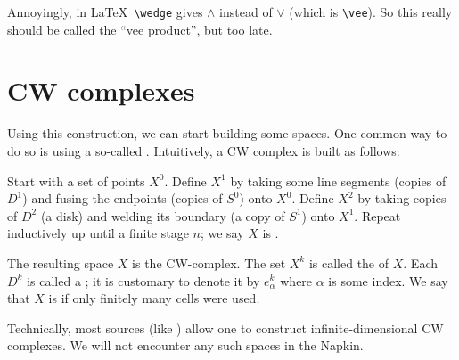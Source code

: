 \begin{remark}
	Annoyingly, in \LaTeX\ \verb+\wedge+ gives $\wedge$ instead
	of $\vee$ (which is \verb+\vee+).
	So this really should be called the ``vee product'', but too late.
\end{remark}


\section{CW complexes}
Using this construction, we can start building some spaces.
One common way to do so is using a so-called .
Intuitively, a CW complex is built as follows:
\begin{itemize}
	\ii Start with a set of points $X^0$.
	\ii Define $X^1$ by taking some line segments (copies of $D^1$)
	and fusing the endpoints (copies of $S^0$) onto $X^0$.
	\ii Define $X^2$ by taking copies of $D^2$ (a disk)
	and welding its boundary (a copy of $S^1$) onto $X^1$.
	\ii Repeat inductively up until a finite stage $n$;
	we say $X$ is .
\end{itemize}
The resulting space $X$ is the CW-complex.
The set $X^k$ is called the  of $X$.
Each $D^k$ is called a ; it is customary to
denote it by $e_\alpha^k$ where $\alpha$ is some index.
We say that $X$ is  if only finitely many cells were used.
\begin{abuse}
	Technically, most sources (like \cite{ref:hatcher}) allow one to
	construct infinite-dimensional CW complexes.
	We will not encounter any such spaces in the Napkin.
\end{abuse}

